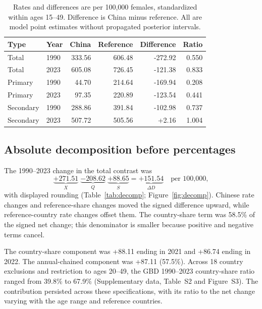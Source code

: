 \documentclass[11pt,a4paper]{article}
\begin{document}
\begin{table}[htbp]\centering\small{}
\caption{PCOS-attributed infertility rates and contrasts under contemporary GBD population shares.}\label{tab:pcos}
\begin{tabular}{llrrrr}\toprule
Type & Year & China & Reference & Difference & Ratio\\\midrule
Total & 1990 & 333.56 & 606.48 & -272.92 & 0.550\\
Total & 2023 & 605.08 & 726.45 & -121.38 & 0.833\\
Primary & 1990 & 44.70 & 214.64 & -169.94 & 0.208\\
Primary & 2023 & 97.35 & 220.89 & -123.54 & 0.441\\
Secondary & 1990 & 288.86 & 391.84 & -102.98 & 0.737\\
Secondary & 2023 & 507.72 & 505.56 & +2.16 & 1.004\\
\bottomrule
\end{tabular}
\caption*{Rates and differences are per 100,000 females, standardized within ages 15--49. Difference is China minus reference. All are model point estimates without propagated posterior intervals.}
\end{table}

\subsection{Absolute decomposition before percentages}
The 1990--2023 change in the total contrast was
\begin{equation}
 \underbrace{+271.51}_{X}\;\underbrace{-208.62}_{Q}\;\underbrace{+88.65}_{S}
 =\underbrace{+151.54}_{\Delta D}\quad\text{per 100,000},
\end{equation}
with displayed rounding (Table~\ref{tab:decomp}; Figure~\ref{fig:decomp}). Chinese rate changes and reference-share changes moved the signed difference upward, while reference-country rate changes offset them. The country-share term was 58.5\% of the signed net change; this denominator is smaller because positive and negative terms cancel.

The country-share component was +88.11 ending in 2021 and +86.74 ending in 2022. The annual-chained component was +87.11 (57.5\%). Across 18 country exclusions and restriction to ages 20--49, the GBD 1990--2023 country-share ratio ranged from 39.8\% to 67.9\% (Supplementary data, Table~S2 and Figure~S3). The contribution persisted across these specifications, with its ratio to the net change varying with the age range and reference countries.
\end{document}
